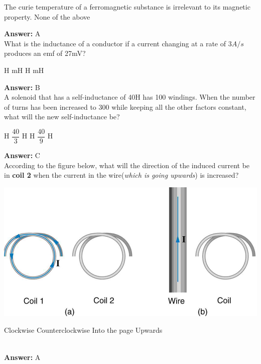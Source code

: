 \documentclass[12pt,addpoints]{exam}
\begin{document}
{{{\begin{questions}
\begin{choices}
						\choice The curie temperature of a ferromagnetic substance is irrelevant to its magnetic property. 
						\choice None of the above
					\end{choices}
					\textbf{Answer:} A\\ 
					\question What is the inductance of a conductor if a current changing at a rate of $3A/s$ produces an emf of 27mV?\\
					\begin{oneparchoices}
						 H
						 mH
						 H
						 mH
					\end{oneparchoices}
					\textbf{Answer:} B\\ 
					\question A solenoid that has a self-inductance of 40H has 100 windings. When the number of turns has been increased to 300 while keeping all the other factors constant, what will the new self-inductance be? \\
					\begin{oneparchoices}
						\choice 120 H
						\choice $\dfrac{40}{3}$ H
						\choice 360 H
						\choice $\dfrac{40}{9}$ H
					\end{oneparchoices}
					\textbf{Answer:} C\\ 
					\question According to the figure below, what will the direction of the induced current be in \textbf{coil 2} when the current in the wire(\textit{which is going upwards}) is increased?
					\begin{center}
						\includegraphics[scale=0.5]{coils}
					\end{center}
					\begin{oneparchoices}
						\choice Clockwise
						\choice Counterclockwise
						\choice Into the page
						\choice Upwards
					\end{oneparchoices}
					\\ \textbf{Answer:} A\\ 

\end{questions}}}}
\end{document}
